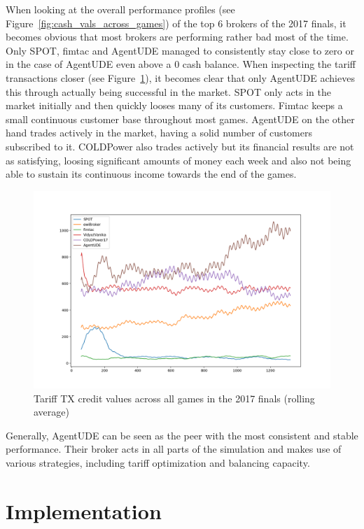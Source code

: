 When looking at the overall performance profiles (see Figure~\ref{fig:cash_vals_across_games}) of the top 6 brokers of
the 2017 finals, it becomes obvious that most brokers are performing rather bad most of the time. Only SPOT, fimtac and
AgentUDE managed to consistently stay close to zero or in the case of AgentUDE even above a 0 cash balance. When
inspecting the tariff transactions closer (see Figure~\ref{fig:allttxucline}), it becomes clear that only AgentUDE
achieves this through actually being successful in the market. SPOT only acts in the market initially and then quickly
looses many of its customers. Fimtac keeps a small continuous customer base throughout most games. AgentUDE on the other
hand trades actively in the market, having a solid number of customers subscribed to it.  COLDPower also trades actively
but its financial results are not as satisfying, loosing significant amounts of money each week and also not being able
to sustain its continuous income towards the end of the games.
\begin{figure}[]
    \centering
    \includegraphics[width=1.0\linewidth]{img/all-ttx-uc-line.png}
    \caption{Tariff TX credit values across all games in the 2017 finals (rolling average)}
    \label{fig:allttxucline}
\end{figure}

Generally, AgentUDE can be seen as the peer with the most consistent and stable performance. Their broker acts in all
parts of the simulation and makes use of various strategies, including tariff optimization and balancing capacity.

\chapter{Implementation}
\label{cha:implementation}

